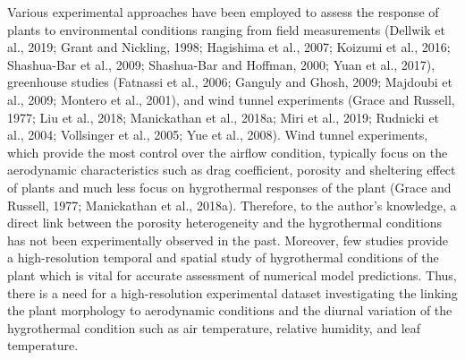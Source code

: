 Various experimental approaches have been employed to assess the response of plants to environmental conditions ranging from field measurements (Dellwik et al., 2019; Grant and Nickling, 1998; Hagishima et al., 2007; Koizumi et al., 2016; Shashua-Bar et al., 2009; Shashua-Bar and Hoffman, 2000; Yuan et al., 2017), greenhouse studies (Fatnassi et al., 2006; Ganguly and Ghosh, 2009; Majdoubi et al., 2009; Montero et al., 2001), and wind tunnel experiments (Grace and Russell, 1977; Liu et al., 2018; Manickathan et al., 2018a; Miri et al., 2019; Rudnicki et al., 2004; Vollsinger et al., 2005; Yue et al., 2008). Wind tunnel experiments, which provide the most control over the airflow condition, typically focus on the aerodynamic characteristics such as drag coefficient, porosity and sheltering effect of plants and much less focus on hygrothermal responses of the plant (Grace and Russell, 1977; Manickathan et al., 2018a). Therefore, to the author’s knowledge, a direct link between the porosity heterogeneity and the hygrothermal conditions has not been experimentally observed in the past. Moreover, few studies provide a high-resolution temporal and spatial study of hygrothermal conditions of the plant which is vital for accurate assessment of numerical model predictions. Thus, there is a need for a high-resolution experimental dataset investigating the linking the plant morphology to aerodynamic conditions and the diurnal variation of the hygrothermal condition such as air temperature, relative humidity, and leaf temperature. 

